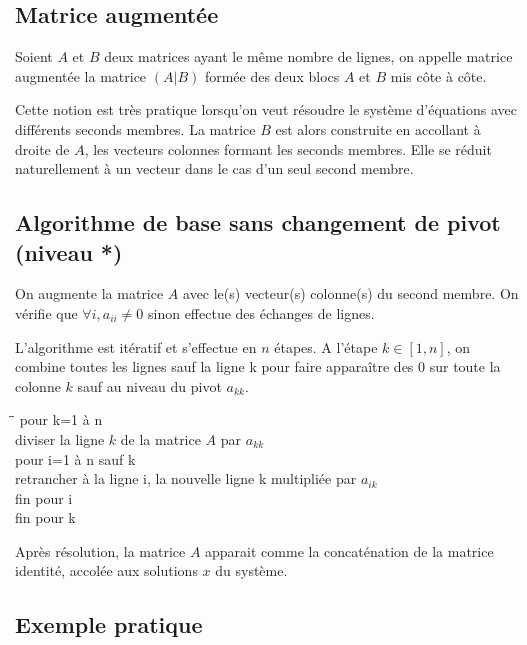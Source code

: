 \documentclass[a4paper, 10pt]{article}
\begin{document}
\subsection{Matrice augmentée}

Soient $A$ et $B$ deux matrices  ayant le même nombre de lignes, on appelle matrice augmentée la matrice $(A | B)$ formée des deux blocs $A$ et $B$ mis côte à côte.

Cette notion est très pratique lorsqu'on veut résoudre le système d'équations avec différents seconds
membres. La matrice $B$ est alors construite en accollant à droite de $A$, les vecteurs colonnes formant les seconds membres.
Elle se réduit naturellement à un vecteur dans le cas d'un seul second membre.

\subsection{Algorithme de base sans changement de pivot (niveau *)}

On augmente la matrice $A$ avec le(s) vecteur(s) colonne(s) du second membre.
On vérifie que $\forall i,  a_{ii} \neq 0$ sinon effectue des échanges de lignes. 

L'algorithme est itératif et s'effectue en $n$ étapes. A l'étape $k \in [1, n]$, on
combine toutes les lignes sauf la ligne k pour faire apparaître des $0$ sur toute
la colonne $k$ sauf au niveau du pivot $a_{kk}$.

\begin{tabbing}
\hspace{1cm}\= \hspace{1cm}\= \kill
pour k=1 à n \\
\> diviser la ligne $k$ de la matrice $A$ par $a_{kk}$ \\
\> pour i=1 à n sauf k \\
\> \> retrancher à la ligne i, la nouvelle ligne k multipliée par $a_{ik}$ \\
\> fin pour i \\
fin pour k \\
\end{tabbing}

Après résolution, la matrice $A$ apparait comme la concaténation de la matrice
identité, accolée aux solutions $x$ du système.

\subsection{Exemple pratique}
\end{document}
